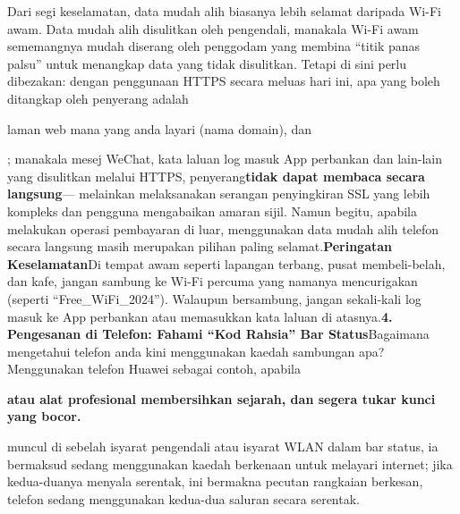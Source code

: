 
Dari segi keselamatan, data mudah alih biasanya lebih selamat daripada Wi-Fi awam. Data mudah alih disulitkan oleh pengendali, manakala Wi-Fi awam sememangnya mudah diserang oleh penggodam yang membina “titik panas palsu” untuk menangkap data yang tidak disulitkan. Tetapi di sini perlu dibezakan: dengan penggunaan HTTPS secara meluas hari ini, apa yang boleh ditangkap oleh penyerang adalah

\begin{tcbpractice}{laman web mana yang anda layari}
(nama domain), dan

\end{tcbpractice}


; manakala mesej WeChat, kata laluan log masuk App perbankan dan lain-lain yang disulitkan melalui HTTPS, penyerang\textbf{tidak dapat membaca secara langsung}— melainkan melaksanakan serangan penyingkiran SSL yang lebih kompleks dan pengguna mengabaikan amaran sijil. Namun begitu, apabila melakukan operasi pembayaran di luar, menggunakan data mudah alih telefon secara langsung masih merupakan pilihan paling selamat.\textbf{Peringatan Keselamatan}Di tempat awam seperti lapangan terbang, pusat membeli-belah, dan kafe, jangan sambung ke Wi-Fi percuma yang namanya mencurigakan (seperti “Free\_WiFi\_2024”). Walaupun bersambung, jangan sekali-kali log masuk ke App perbankan atau memasukkan kata laluan di atasnya.\textbf{4. Pengesanan di Telefon: Fahami “Kod Rahsia” Bar Status}Bagaimana mengetahui telefon anda kini menggunakan kaedah sambungan apa? Menggunakan telefon Huawei sebagai contoh, apabila

\textbf{atau alat profesional membersihkan sejarah, dan segera tukar kunci yang bocor.}\par

muncul di sebelah isyarat pengendali atau isyarat WLAN dalam bar status, ia bermaksud sedang menggunakan kaedah berkenaan untuk melayari internet; jika kedua-duanya menyala serentak, ini bermakna pecutan rangkaian berkesan, telefon sedang menggunakan kedua-dua saluran secara serentak.


